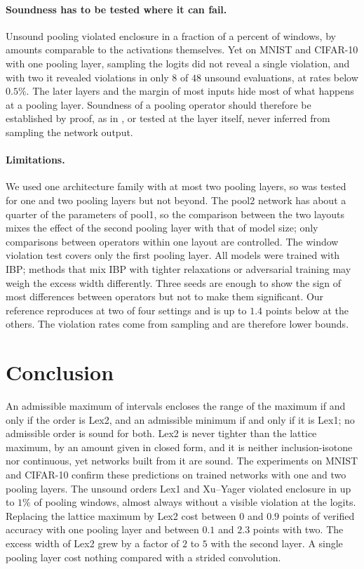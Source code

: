 \paragraph{Soundness has to be tested where it can fail.} Unsound pooling violated enclosure in a fraction of a percent of windows, by amounts comparable to the activations themselves. Yet on MNIST and CIFAR-10 with one pooling layer, sampling the logits did not reveal a single violation, and with two it revealed violations in only $8$ of $48$ unsound evaluations, at rates below $0.5\%$. The later layers and the margin of most inputs hide most of what happens at a pooling layer. Soundness of a pooling operator should therefore be established by proof, as in , or tested at the layer itself, never inferred from sampling the network output.

\paragraph{Limitations.} We used one architecture family with at most two pooling layers, so  was tested for one and two pooling layers but not beyond. The pool2 network has about a quarter of the parameters of pool1, so the comparison between the two layouts mixes the effect of the second pooling layer with that of model size; only comparisons between operators within one layout are controlled. The window violation test covers only the first pooling layer. All models were trained with IBP; methods that mix IBP with tighter relaxations or adversarial training \cite{zhang2020crownibp,muller2023sabr,depalma2024} may weigh the excess width differently. Three seeds are enough to show the sign of most differences between operators but not to make them significant. Our reference reproduces \citet{shi2021} at two of four settings and is up to $1.4$ points below at the others. The violation rates come from sampling and are therefore lower bounds.

\section{Conclusion}

An admissible maximum of intervals encloses the range of the maximum if and only if the order is Lex2, and an admissible minimum if and only if it is Lex1; no admissible order is sound for both. Lex2 is never tighter than the lattice maximum, by an amount given in closed form, and it is neither inclusion-isotone nor continuous, yet networks built from it are sound. The experiments on MNIST and CIFAR-10 confirm these predictions on trained networks with one and two pooling layers. The unsound orders Lex1 and Xu--Yager violated enclosure in up to $1\%$ of pooling windows, almost always without a visible violation at the logits. Replacing the lattice maximum by Lex2 cost between $0$ and $0.9$ points of verified accuracy with one pooling layer and between $0.1$ and $2.3$ points with two. The excess width of Lex2 grew by a factor of $2$ to $5$ with the second layer. A single pooling layer cost nothing compared with a strided convolution.

